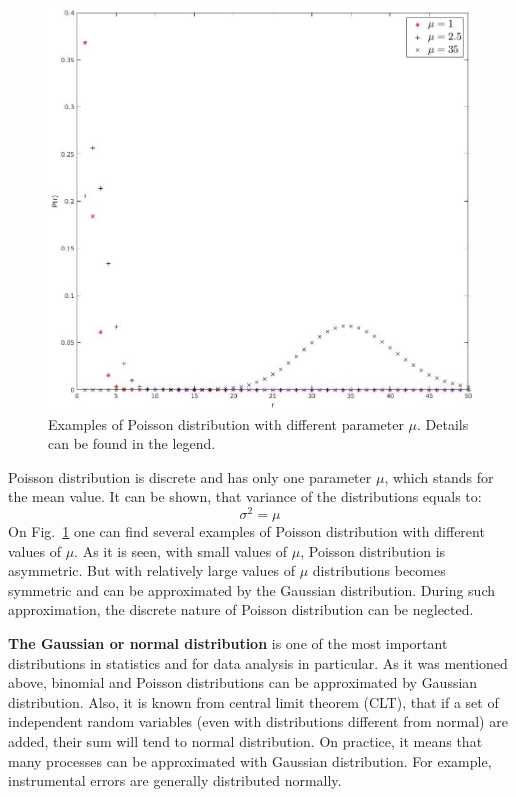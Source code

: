 \documentclass[12pt,a4paper]{report}
\begin{document}
\begin{figure}[!h]
\begin{center}
\includegraphics*[scale = 0.4]{Figures/Poisson}
\caption{\label{fig:Poisson} Examples of Poisson distribution with different parameter $\mu$. Details can be found in the legend.}
\end{center}
\end{figure}
Poisson distribution is discrete and has only one parameter $\mu$, which stands for the mean value. It can be shown, that variance of the distributions equals to:
\begin{equation}
\sigma^2 = \mu 
\end{equation}
On Fig.~\ref{fig:Poisson} one can find several examples of Poisson distribution with different values of $\mu$. As it is seen, with small values of $\mu$, Poisson distribution is asymmetric. But with relatively large values of $\mu$ distributions becomes symmetric and can be approximated by the Gaussian distribution. During such approximation, the discrete nature of Poisson distribution can be neglected.  \par
\textbf{The Gaussian or normal distribution} is one of the most important distributions in statistics and for data analysis in particular. As it was mentioned above, binomial and Poisson distributions can be approximated by Gaussian distribution. Also, it is known from central limit theorem (CLT), that if a set of independent random variables (even with distributions different from normal) are added, their sum will tend to normal distribution. On practice, it means that many processes can be approximated with Gaussian distribution. For example, instrumental errors are generally distributed normally.
\end{document}
